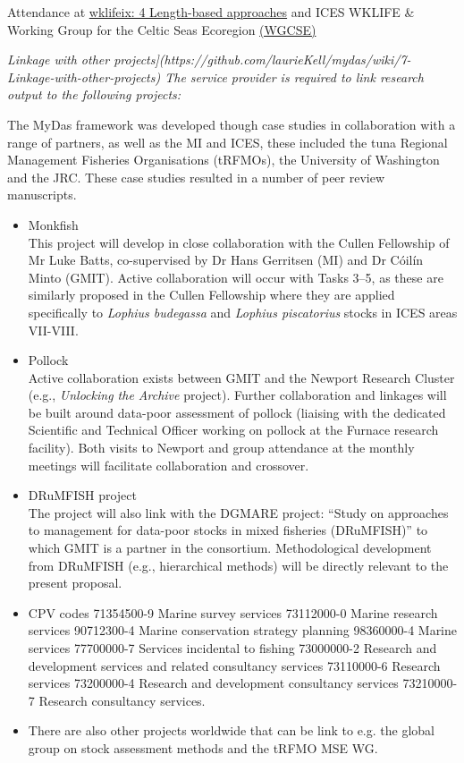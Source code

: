 Attendance at \href{http://ices.dk/sites/pub/Publication Reports/Expert Group Report/Fisheries Resources Steering Group/2019/WKLIFEIX/WKLIFE_IX_2019.pdf#page=30}{wklifeix: 4 Length-based approaches} and 
ICES WKLIFE \& Working Group for the Celtic Seas Ecoregion \href{https://www.ices.dk/community/groups/Pages/WGCSE.aspx}{(WGCSE)}


\textit{Linkage with other projects](https://github.com/laurieKell/mydas/wiki/7-Linkage-with-other-projects) The service provider is required to link research output to the following projects: }

The MyDas framework was developed though case studies in collaboration with a range of partners, as well as the MI and ICES, these included the tuna Regional Management Fisheries Organisations (tRFMOs), the University of Washington and the JRC. These case studies resulted in a number of peer review manuscripts. 

\begin{itemize}
 \item Monkfish\\
 This project will develop in close collaboration with the Cullen Fellowship of Mr Luke Batts, co-supervised by Dr Hans Gerritsen (MI) and Dr C\'oil\'in Minto (GMIT). Active collaboration will occur with Tasks 3--5, as these are similarly proposed in the Cullen Fellowship where they are applied specifically to \textit{Lophius budegassa} and \textit{Lophius piscatorius} stocks in ICES areas VII-VIII.
 \item Pollock \\
 Active collaboration exists between GMIT and the Newport Research Cluster (e.g., \emph{Unlocking the Archive} project). Further collaboration and linkages will be built around data-poor assessment of pollock (liaising with the dedicated Scientific and Technical Officer working on pollock at the Furnace research facility). Both visits to Newport and group attendance at the monthly meetings will facilitate collaboration and crossover.
 \item DRuMFISH project \\
 The project will also link with the DGMARE project: ``Study on approaches to management for data-poor stocks in mixed fisheries (DRuMFISH)'' to which GMIT is a partner in the consortium. Methodological development from DRuMFISH (e.g., hierarchical methods) will be directly relevant to the present proposal. 
 \item CPV codes 71354500-9 Marine survey services 73112000-0 Marine research services 90712300-4 Marine conservation strategy planning 98360000-4 Marine services 77700000-7 Services incidental to fishing 73000000-2 Research and development services and related consultancy services 73110000-6 Research services 73200000-4 Research and development consultancy services 73210000-7 Research consultancy services.
 \item There are also other projects worldwide that can be link to e.g. the global group on stock assessment methods and the tRFMO MSE WG. 
 \end{itemize}

